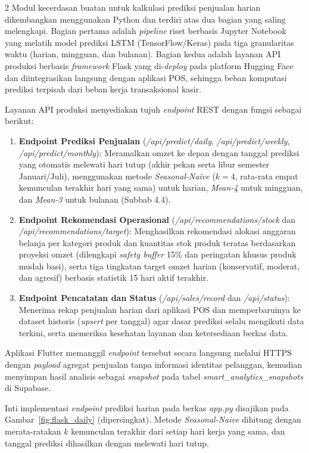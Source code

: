 \documentclass[12pt, a4paper, onecolumn, oneside]{report}
\begin{document}
\begin{spacing}{2}
Modul kecerdasan buatan untuk kalkulasi prediksi penjualan harian dikembangkan menggunakan Python dan terdiri atas dua bagian yang saling melengkapi. Bagian pertama adalah \textit{pipeline} riset berbasis Jupyter Notebook yang melatih model prediksi LSTM (TensorFlow/Keras) pada tiga granularitas waktu (harian, mingguan, dan bulanan). Bagian kedua adalah layanan API produksi berbasis \textit{framework} Flask yang di-\textit{deploy} pada platform Hugging Face dan diintegrasikan langsung dengan aplikasi POS, sehingga beban komputasi prediksi terpisah dari beban kerja transaksional kasir.

Layanan API produksi menyediakan tujuh \textit{endpoint} REST dengan fungsi sebagai berikut:
\begin{enumerate}
    \item \textbf{Endpoint Prediksi Penjualan} (\textit{/api/predict/daily}, \textit{/api/predict/weekly}, \textit{/api/predict/monthly}): Meramalkan omzet ke depan dengan tanggal prediksi yang otomatis melewati hari tutup (akhir pekan serta libur semester Januari/Juli), menggunakan metode \textit{Seasonal-Naive} ($k=4$, rata-rata empat kemunculan terakhir hari yang sama) untuk harian, \textit{Mean-4} untuk mingguan, dan \textit{Mean-3} untuk bulanan (Subbab 4.4).
    \item \textbf{Endpoint Rekomendasi Operasional} (\textit{/api/recommendations/stock} dan \textit{/api/recommendations/target}): Menghasilkan rekomendasi alokasi anggaran belanja per kategori produk dan kuantitas stok produk teratas berdasarkan proyeksi omzet (dilengkapi \textit{safety buffer} 15\% dan peringatan khusus produk mudah basi), serta tiga tingkatan target omzet harian (konservatif, moderat, dan agresif) berbasis statistik 15 hari aktif terakhir.
    \item \textbf{Endpoint Pencatatan dan Status} (\textit{/api/sales/record} dan \textit{/api/status}): Menerima rekap penjualan harian dari aplikasi POS dan memperbaruinya ke dataset historis (\textit{upsert} per tanggal) agar dasar prediksi selalu mengikuti data terkini, serta memeriksa kesehatan layanan dan ketersediaan berkas data.
\end{enumerate}

Aplikasi Flutter memanggil \textit{endpoint} tersebut secara langsung melalui HTTPS dengan \textit{payload} agregat penjualan tanpa informasi identitas pelanggan, kemudian menyimpan hasil analisis sebagai \textit{snapshot} pada tabel \textit{smart\_analytics\_snapshots} di Supabase.

Inti implementasi \textit{endpoint} prediksi harian pada berkas \textit{app.py} disajikan pada Gambar~\ref{fig:flask_daily} (dipersingkat). Metode \textit{Seasonal-Naive} dihitung dengan merata-ratakan $k$ kemunculan terakhir dari setiap hari kerja yang sama, dan tanggal prediksi dihasilkan dengan melewati hari tutup.


\end{spacing}
\end{document}
